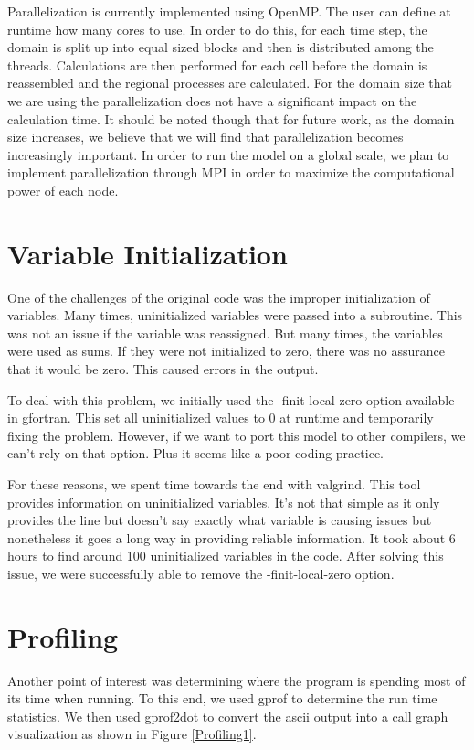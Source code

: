 \documentclass[pdftex,12pt,a4paper]{article}
\begin{document}
Parallelization is currently implemented using OpenMP. The user can define at runtime how many cores to use. In order to do this, for each time step, the domain is split up into equal sized blocks and then is distributed among the threads. Calculations are then performed for each cell before the domain is reassembled and the regional processes are calculated. For the domain size that we are using the parallelization does not have a significant impact on the calculation time. It should be noted though that for future work, as the domain size increases, we believe that we will find that parallelization becomes increasingly important. In order to run the model on a global scale, we plan to implement parallelization through MPI in order to maximize the computational power of each node.

\section{Variable Initialization}
One of the challenges of the original code was the improper initialization of variables. Many times, uninitialized variables were passed into a subroutine. This was not an issue if the variable was reassigned. But many times, the variables were used as sums. If they were not initialized to zero, there was no assurance that it would be zero. This caused errors in the output. 

To deal with this problem, we initially used the -finit-local-zero option available in gfortran. This set all uninitialized values to 0 at runtime and temporarily fixing the problem. However, if we want to port this model to other compilers, we can't rely on that option. Plus it seems like a poor coding practice. 

For these reasons, we spent time towards the end with valgrind. This tool provides information on uninitialized variables. It's not that simple as it only provides the line but doesn't say exactly what variable is causing issues but nonetheless it goes a long way in providing reliable information. It took about 6 hours to find around 100 uninitialized variables in the code. After solving this issue, we were successfully able to remove the -finit-local-zero option.

\section{Profiling}

Another point of interest was determining where the program is spending most of its time when running. To this end, we used gprof to determine the run time statistics. We then used gprof2dot to convert the ascii output into a call graph visualization as shown in Figure \ref{Profiling1}. 
\end{document}
